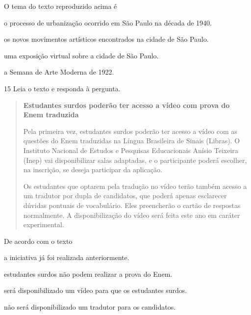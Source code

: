 O tema do texto reproduzido acima é

\begin{escolha}
  \item o processo de urbanização ocorrido em São Paulo na década de 1940.

  \item os novos movimentos artísticos encontrados na cidade de São Paulo.

  \item uma exposição virtual sobre a cidade de São Paulo.

  \item a Semana de Arte Moderna de 1922.
\end{escolha}

\num{15} Leia o texto e responda à pergunta.

\begin{quote}
\textbf{Estudantes surdos poderão ter acesso a vídeo com prova do Enem
traduzida}

Pela primeira vez, estudantes surdos poderão ter acesso a vídeo com as
questões do Enem traduzidas na Língua Brasileira de Sinais (Libras). O
Instituto Nacional de Estudos e Pesquisas Educacionais Anísio Teixeira
(Inep) vai disponibilizar salas adaptadas, e o participante poderá
escolher, na inscrição, se deseja participar da aplicação.

Os estudantes que optarem pela tradução no vídeo terão também acesso a
um tradutor por dupla de candidatos, que poderá apenas esclarecer
dúvidas pontuais de vocabulário. Eles preencherão o cartão de respostas
normalmente. A disponibilização do vídeo será feita este ano em caráter
experimental.

\end{quote}

De acordo com o texto

\begin{escolha}
  \item a iniciativa já foi realizada anteriormente.

  \item estudantes surdos não podem realizar a prova do Enem.

  \item será disponibilizado um vídeo para que os estudantes surdos.

  \item não será disponibilizado um tradutor para os candidatos.
\end{escolha}



